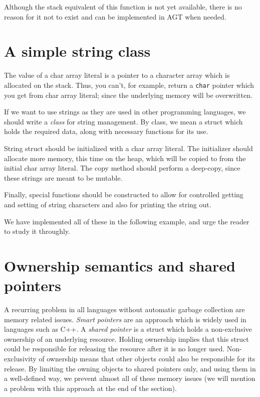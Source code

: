 \documentclass[times, utf8, diplomski]{fer}
\theoremstyle{definition}
\newcommand{\textcode}[3]{
    
}
\begin{document}
Although the stack equivalent of this function is not yet available, there
is no reason for it not to exist and can be implemented in AGT when needed.

\section{A simple string class}

The value of a char array literal is a pointer to a character array
which is allocated on the stack. Thus, you can't, for example, return
a \texttt{char} pointer which you get from char array literal;
since the underlying memory will be overwritten.

If we want to use strings as they are used in other programming languages,
we should write a \textit{class} for string management.
By class, we mean a struct which holds the required data, along with necessary functions for its use.

String struct should be initialized with a char array literal.
The initializer should allocate more memory, this time on the heap,
which will be copied to from the initial char array literal.
The copy method should perform a deep-copy, since these strings are meant to be mutable.

Finally, special functions should be constructed to allow for controlled getting and setting of
string characters and also for printing the string out.

We have implemented all of these in the following example, and urge the reader
to study it throughly.

\textcode{\resdir/programs/string_mgmt.agt}{string_cl}{String class}
\textcode{\resdir/programs/string_mgmt.out}{string_cl_out}{String class - output}

\section{Ownership semantics and shared pointers}

A recurring problem in all languages without automatic garbage collection are
memory related issues.  \textit{Smart pointers} are an approach which is widely
used in languages such as C++.  A \textit{shared pointer}
is a struct which holds a non-exclusive ownership of an underlying resource.
Holding ownership implies that this struct could be responsible for releasing
the resource after it is no longer used. Non-exclusivity of ownership means
that other objects could also be responsible for its release. By limiting the
owning objects to shared pointers only, and using them in a well-defined way,
we prevent almost all of these memory issues (we will mention a problem with
this approach at the end of the section).
\end{document}
